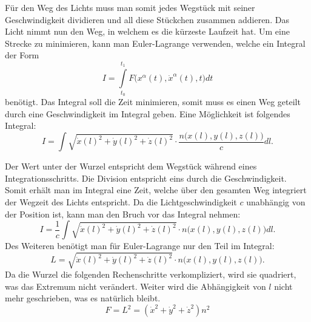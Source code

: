 \begin{refsection}
Für den Weg des Lichts muss man somit jedes Wegstück mit seiner
Geschwindigkeit dividieren und all diese Stückchen zusammen addieren.
Das Licht nimmt nun den Weg, in welchem es die kürzeste Laufzeit hat.
Um eine Strecke zu minimieren, kann man Euler-Lagrange verwenden,
welche ein Integral der Form
\begin{equation*}
  I = \int\limits_{t_0}^{t_1}\! F\bigl(x^{\alpha}(t), \dot{x}^{\alpha}(t),t\bigr)d t
\end{equation*}
benötigt.  Das Integral soll die Zeit minimieren, somit muss es einen
Weg geteilt durch eine Geschwindigkeit im Integral geben.  Eine
Möglichkeit ist folgendes Integral:
\begin{equation}
  I = \int\! \sqrt{\dot{x}(l)^2+\dot{y}(l)^2+\dot{z}(l)^2} \cdot
  \frac{n\bigl(x(l),y(l),z(l)\bigr)}{c} d l.
\end{equation}

Der Wert unter der Wurzel entspricht dem Wegstück während eines
Integrationsschritts.  Die Division entspricht eins durch die
Geschwindigkeit.  Somit erhält man im Integral eine Zeit, welche über
den gesamten Weg integriert der Wegzeit des Lichts entspricht.  Da die
Lichtgeschwindigkeit \(c\) unabhängig von der Position ist, kann man
den Bruch vor das Integral nehmen:
\begin{equation}
  I = \frac{1}{c}\int\! \sqrt{\dot{x}(l)^2+\dot{y}(l)^2+\dot{z}(l)^2}
  \cdot n\bigl(x(l),y(l),z(l)\bigr) d l.
\end{equation}
Des Weiteren benötigt man für Euler-Lagrange nur den Teil im Integral:
\begin{equation}
  L = \sqrt{\dot{x}(l)^2+\dot{y}(l)^2+\dot{z}(l)^2}
  \cdot n\bigl(x(l),y(l),z(l)\bigr).
\end{equation}
Da die Wurzel die folgenden Rechenschritte verkompliziert, wird sie
quadriert, was das Extremum nicht verändert.  Weiter wird die
Abhängigkeit von \(l\) nicht mehr geschrieben, was es natürlich
bleibt.
\begin{equation}
  F = L^2 = (\dot{x}^2+\dot{y}^2+\dot{z}^2)n^2
\end{equation}


\end{refsection}
